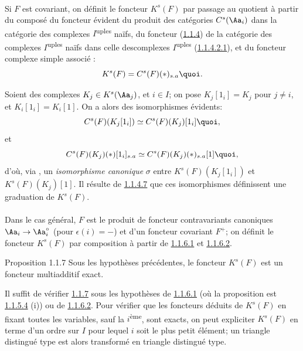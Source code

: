 \documentclass[10pt]{../fichiers-configuration-latex/smfart}
\begin{document}
\paragraph{}
Si $F$ est covariant, on définit le foncteur $K^{s}(F)$ par passage au
quotient à partir du composé du foncteur évident du produit des
catégories $C^{s}(\Aa_i)$ dans la catégorie des complexes
$I$\textsuperscript{uples} naïfs, du foncteur (\hyperref[XVII.subsubsec1.1.4]{1.1.4})
de la catégorie des complexes $I$\textsuperscript{uples} naïfs dans celle
des\pageoriginale complexes $I$\textsuperscript{uples} (\hyperref[XVII.par1.1.4.2.1]{1.1.4.2.1}), et du
foncteur complexe simple associé :
\[
K^{s}(F)=C^{s}(F)(\ast)_{s.a}{\quoi}.
\]

Soient des complexes $K_j\in K^{s}(\Aa_j)$, et $i\in I$; on
pose $K_j[1_i]=K_j$ pour $j\neq i$, et $K_i[1_i]=K_{i}[1]$. On a alors
des isomorphismes évidents:
\[
C^{s}(F)(K_{j}[1_i])\simeq C^{s}(F)(K_j)[1_i]{\quoi},
\]
et
\[
C^{s}(F)(K_j)(\ast)[1_i]_{s.a}\simeq
C^{s}(F)(K_j)(\ast)_{s.a}[1]{\quoi},
\]
d'où, via , un \emph{isomorphisme canonique} $\sigma$ entre
$K^{s}(F)(K_{j}[1_i])$ et $K^{s}(F)(K_{j})[1]$. Il résulte de \hyperref[XVII.par1.1.4.7]{1.1.4.7}
que ces isomorphismes définissent une graduation de $K^{s}(F)$.

\paragraph{}
Dans le cas général, $F$ est le produit de foncteur contravariants
canoniques $\Aa_i\rightarrow \Aa^{\circ}_i$ (pour
$\epsilon(i)=-$) et d'un foncteur covariant $F^{+}$; on définit le
foncteur $K^{s}(F)$ par composition à partir de \hyperref[XVII.par1.1.6.1]{1.1.6.1}
et \hyperref[XVII.par1.1.6.2]{1.1.6.2}.

\begin{enonce*}{Proposition 1.1.7}
Sous les hypothèses précédentes, le foncteur $K^{s}(F)$ est un
foncteur multiadditif exact.
\end{enonce*}

Il suffit de vérifier \hyperref[XVII.prop1.1.7]{1.1.7} sous les hypothèses de
\hyperref[XVII.par1.1.6.1]{1.1.6.1} (où la proposition est \hyperref[XVII.lem1.1.5.4]{1.1.5.4} (i)) ou de
\hyperref[XVII.par1.1.6.2]{1.1.6.2}. Pour vérifier que les foncteurs déduits de $K^{s}(F)$ en
fixant toutes les variables, sauf la $i$\textsuperscript{ème}, sont
exacts, on peut expliciter $K^{s}(F)$ en terme d'un ordre sur $I$ pour
lequel $i$ soit le plus petit élément; un triangle distingué
type\pageoriginale {} est alors transformé en triangle
distingué type.
\end{document}
